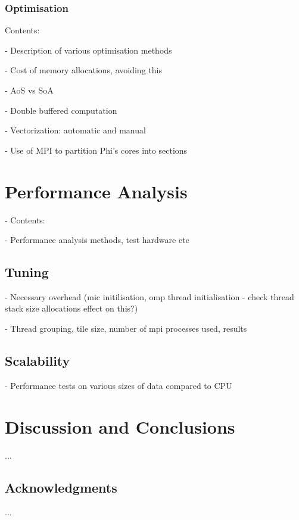 \documentclass{easychair}
\begin{document}
\subsubsection{Optimisation}
\label{sect:micoptimisation}

\noindent
Contents:

\noindent
- Description of various optimisation methods

\noindent
- Cost of memory allocations, avoiding this

\noindent
- AoS vs SoA

\noindent
- Double buffered computation

\noindent
- Vectorization: automatic and manual

\noindent
- Use of MPI to partition Phi's cores into sections



\section{Performance Analysis}
\label{sect:performance}

\noindent
- Contents:

\noindent
- Performance analysis methods, test hardware etc


\subsection{Tuning}
\label{sect:tuning}

\noindent
- Necessary overhead (mic initilisation, omp thread initialisation - check thread stack size allocations effect on this?)

\noindent
- Thread grouping, tile size, number of mpi processes used, results

\subsection{Scalability}
\label{sect:scalability}

\noindent
- Performance tests on various sizes of data compared to CPU

\section{Discussion and Conclusions}
\label{sect:conclusions}

...

\subsection{Acknowledgments}
\label{sect:acks}

...

\end{document}
